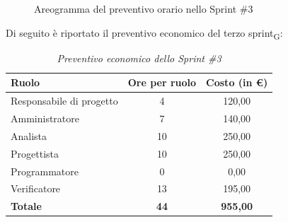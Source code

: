 ﻿\documentclass[a4paper, 10pt, colorlinks=true, linkcolor=black, urlcolor=blue, citecolor=blue, hidelinks]{article}
\renewcommand{\arraystretch}{1.2}
\begin{document}
\begin{figure}[H]

\caption{Areogramma del preventivo orario nello Sprint \#3}
\label{fig:preventivo-sprint3}
\end{figure}

Di seguito è riportato il preventivo economico del terzo sprint\textsubscript{G}:

\begin{table}[H]
    \centering
    \renewcommand{\arraystretch}{1.4}
    \begin{tabular}{|l|c|c|}
        \hline
        \rowcolor{bluBitless!15}
        \textbf{Ruolo} & \textbf{Ore per ruolo} & \textbf{Costo (in €)} \\
        \hline
        Responsabile di progetto & 4 & 120,00 \\ \hline
        Amministratore & 7 & 140,00 \\ \hline
        Analista & 10 & 250,00 \\ \hline
        Progettista & 10 & 250,00 \\ \hline
        Programmatore & 0 & 0,00 \\ \hline
        Verificatore & 13 & 195,00 \\ \hline
        \rowcolor{bluBitless!8}
        \textbf{Totale} & \textbf{44} & \textbf{955,00} \\ \hline
    \end{tabular}
    \caption{\textit{Preventivo economico dello Sprint \#3}}
\end{table}
\end{document}
